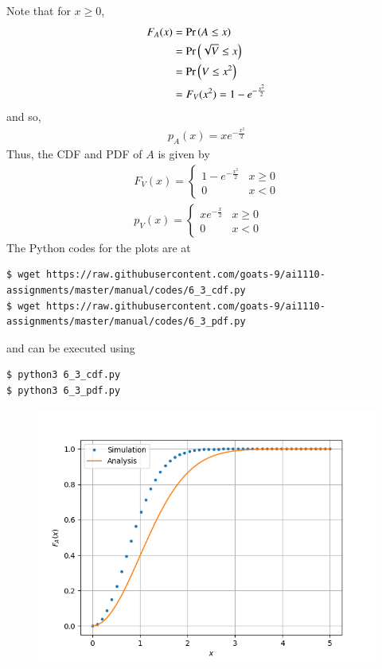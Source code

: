 \documentclass[journal,12pt,twocolumn]{IEEEtran}
\renewcommand\thesection{\arabic{section}}
\begin{document}
\begin{enumerate}[label=\thesection.\arabic*
,ref=\thesection.\theenumi]
Note that for $x \geq 0$,
\begin{align}
	F_A(x) &= \Pr\left(A \leq x\right) \\
	&= \Pr\left(\sqrt{V} \leq x\right) \\
	&= \Pr\left(V \leq x^2\right) \\
	&= F_V(x^2) = 1 - e^{-\frac{x^2}{2}}
\end{align}
and so,
\begin{align}
	p_A(x) = xe^{-\frac{x^2}{2}}
\end{align}
Thus, the CDF and PDF of $A$ is given by
\begin{align}
	F_V(x) = 
	\begin{cases}
		1 - e^{-\frac{x^2}{2}} & x \geq 0 \\
		0 & x < 0 
	\end{cases} \label{eq:ral-cdf} \\
	p_V(x) = 
	\begin{cases}
		xe^{-\frac{x}{2}} & x \geq 0 \\
		0 & x < 0
	\end{cases} \label{eq:ral-pdf} 
\end{align}
The Python codes for the plots are at
\begin{lstlisting}
$ wget https://raw.githubusercontent.com/goats-9/ai1110-assignments/master/manual/codes/6_3_cdf.py
$ wget https://raw.githubusercontent.com/goats-9/ai1110-assignments/master/manual/codes/6_3_pdf.py
\end{lstlisting}
and can be executed using
\begin{lstlisting}
$ python3 6_3_cdf.py
$ python3 6_3_pdf.py
\end{lstlisting}
\begin{figure}[!htb]
	\includegraphics[width=\columnwidth]{figs/6_3_cdf.png}

\end{figure}
\end{enumerate}
\end{document}
